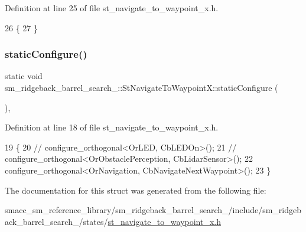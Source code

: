 Definition at line 25 of file st\+\_\+navigate\+\_\+to\+\_\+waypoint\+\_\+x.\+h.


\begin{DoxyCode}
26         \{
27         \}
\end{DoxyCode}
\mbox{\label{structsm__ridgeback__barrel__search__1_1_1StNavigateToWaypointX_a42eefeafb5e4bf22315e1e99b240dcf2}} 
\subsubsection{\texorpdfstring{static\+Configure()}{staticConfigure()}}
{\footnotesize\ttfamily static void sm\+\_\+ridgeback\+\_\+barrel\+\_\+search\+\_\+::\+St\+Navigate\+To\+Waypoint\+X\+::static\+Configure (\begin{DoxyParamCaption}{ }\end{DoxyParamCaption})\hspace{0.3cm}{\ttfamily [inline]}, {\ttfamily [static]}}



Definition at line 18 of file st\+\_\+navigate\+\_\+to\+\_\+waypoint\+\_\+x.\+h.


\begin{DoxyCode}
19         \{
20             \textcolor{comment}{// configure\_orthogonal<OrLED, CbLEDOn>();}
21             \textcolor{comment}{// configure\_orthogonal<OrObstaclePerception, CbLidarSensor>();}
22             configure\_orthogonal<OrNavigation, CbNavigateNextWaypoint>();
23         \}
\end{DoxyCode}


The documentation for this struct was generated from the following file\+:\begin{DoxyCompactItemize}
\item 
smacc\+\_\+sm\+\_\+reference\+\_\+library/sm\+\_\+ridgeback\+\_\+barrel\+\_\+search\+\_/include/sm\+\_\+ridgeback\+\_\+barrel\+\_\+search\+\_/states/\hyperlink{sm__ridgeback__barrel__search__1_2include_2sm__ridgeback__barrel__search__1_2states_2st__navigate__to__waypoint__x_8h}{st\+\_\+navigate\+\_\+to\+\_\+waypoint\+\_\+x.\+h}\end{DoxyCompactItemize}
